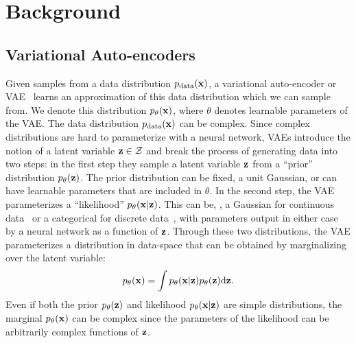 \chapter{Background}
\label{sec:background}


\section{Variational Auto-encoders}
Given samples from a data distribution $p_{\rm{data}}({\mathbf{x}})$, a variational auto-encoder or VAE~\citep{kingma2013auto,rezende2014stochastic} learns an approximation of this data distribution which we can sample from. We denote this distribution $p_\theta({\mathbf{x}})$, where $\theta$ denotes learnable parameters of the VAE. The data distribution $p_{\rm{data}}({\mathbf{x}})$ can be complex. Since complex distributions are hard to parameterize with a neural network, VAEs introduce the notion of a latent variable ${\mathbf{z}} \in {\mathcal{Z}}$ and break the process of generating data into two steps: in the first step they sample a latent variable ${\mathbf{z}}$ from a ``prior'' distribution $p_\theta({\mathbf{z}})$. The prior distribution can be fixed, \eg a unit Gaussian, or can have learnable parameters that are included in $\theta$. In the second step, the VAE parameterizes a ``likelihood'' $p_\theta({\mathbf{x}}|{\mathbf{z}})$. This can be, \eg, a Gaussian for continuous data~\citep{kingma2013auto} or a categorical for discrete data~\citep{child2020very}, with parameters output in either case by a neural network as a function of ${\mathbf{z}}$. Through these two distributions, the VAE parameterizes a distribution in data-space that can be obtained by marginalizing over the latent variable:
\begin{equation} \label{eq:vae-marginal}
p_\theta({\mathbf{x}}) = \int p_\theta({\mathbf{x}}|{\mathbf{z}})p_\theta({\mathbf{z}}) \mathrm{d}{\mathbf{z}}.
\end{equation}
Even if both the prior $p_\theta({\mathbf{z}})$ and likelihood $p_\theta({\mathbf{x}}|{\mathbf{z}})$ are simple distributions, the marginal $p_\theta({\mathbf{x}})$ can be complex since the parameters of the likelihood can be arbitrarily complex functions of ${\mathbf{z}}$.

